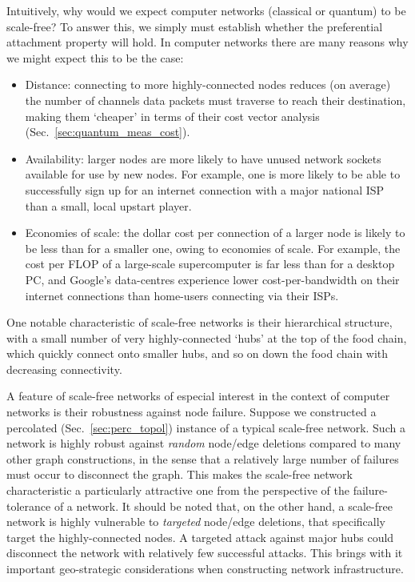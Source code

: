 Intuitively, why would we expect computer networks (classical or quantum) to be scale-free? To answer this, we simply must establish whether the preferential attachment property will hold. In computer networks there are many reasons why we might expect this to be the case:
\begin{itemize}
	\item Distance: connecting to more highly-connected nodes reduces (on average) the number of channels data packets must traverse to reach their destination, making them `cheaper' in terms of their cost vector analysis (Sec.~\ref{sec:quantum_meas_cost}).
	\item Availability: larger nodes are more likely to have unused network sockets available for use by new nodes. For example, one is more likely to be able to successfully sign up for an internet connection with a major national ISP than a small, local upstart player.
	\item Economies of scale: the dollar cost per connection of a larger node is likely to be less than for a smaller one, owing to economies of scale. For example, the cost per FLOP of a large-scale supercomputer is far less than for a desktop PC, and Google's data-centres experience lower cost-per-bandwidth on their internet connections than home-users connecting via their ISPs.
\end{itemize}

One notable characteristic of scale-free networks is their hierarchical structure, with a small number of very highly-connected `hubs' at the top of the food chain, which quickly connect onto smaller hubs, and so on down the food chain with decreasing connectivity.

A feature of scale-free networks of especial interest in the context of computer networks is their robustness against node failure. Suppose we constructed a percolated (Sec.~\ref{sec:perc_topol}) instance of a typical scale-free network. Such a network is highly robust against \textit{random} node/edge deletions compared to many other graph constructions, in the sense that a relatively large number of failures must occur to disconnect the graph. This makes the scale-free network characteristic a particularly attractive one from the perspective of the failure-tolerance of a network. It should be noted that, on the other hand, a scale-free network is highly vulnerable to \textit{targeted} node/edge deletions, that specifically target the highly-connected nodes. A targeted attack against major hubs could disconnect the network with relatively few successful attacks. This brings with it important geo-strategic considerations when constructing network infrastructure.

